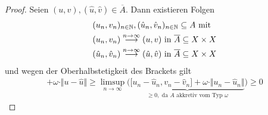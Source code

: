 \begin{proof}
	Seien $(u,v),(\hat{u},\hat{v})\in\overline{A}$. Dann existieren Folgen 
	\begin{align*}
		&(u_n,v_n)_{n\in\mathbb{N}},(\hat{u}_n,\hat{v}_n)_{n\in\mathbb{N}}\subseteq A\text{ mit }\\
		&(u_n,v_n)
		\stackrel{n\to\infty}{\longrightarrow}
		(u,v)\text{ in } \overline{A} \subseteq X\times X\\
		&(\hat{u}_n,\hat{v}_n)
		\stackrel{n\to\infty}{\longrightarrow}
		(\hat{u},\hat{v})\text{ in } \overline{A} \subseteq X\times X
	\end{align*}
	und wegen der Oberhalbstetigkeit des Brackets gilt
	\begin{align*}
		[u-\hat{u},v-\hat{v}]+\omega\cdot\Vert u-\hat{u}\Vert
		\geq
		\limsup\limits_{n\to\infty}\Big(\underbrace{\big[ u_n-\hat{u}_n,v_n-\hat{v}_n\big]+\omega\cdot\Vert u_n-\hat{u}_n\Vert}_{\geq0,\text{ da $A$ akkretiv vom Typ $\omega$}}\Big)
		\geq0
	\end{align*}
\end{proof}

